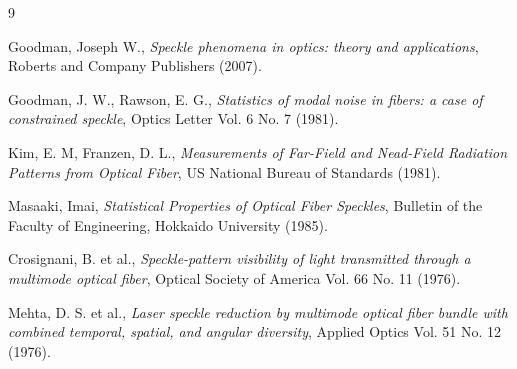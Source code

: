 \documentclass[]{article}
\begin{document}
{9}

Goodman, Joseph W., \emph{Speckle phenomena in optics: theory and
applications}, Roberts and Company Publishers (2007).

Goodman, J. W., Rawson, E. G., \emph{Statistics of modal noise in
fibers: a case of constrained speckle}, Optics Letter Vol. 6 No. 7
(1981).

Kim, E. M, Franzen, D. L., \emph{Measurements of Far-Field and
Nead-Field Radiation Patterns from Optical Fiber}, US National Bureau of
Standards (1981).

Masaaki, Imai, \emph{Statistical Properties of Optical Fiber Speckles},
Bulletin of the Faculty of Engineering, Hokkaido University (1985).

Crosignani, B. et al., \emph{Speckle-pattern visibility of light
transmitted through a multimode optical fiber}, Optical Society of
America Vol. 66 No. 11 (1976).

Mehta, D. S. et al., \emph{Laser speckle reduction by multimode optical
fiber bundle with combined temporal, spatial, and angular diversity},
Applied Optics Vol. 51 No. 12 (1976).
\end{document}
